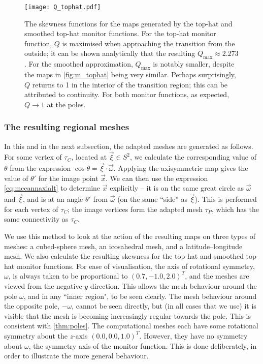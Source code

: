 \documentclass[11pt, a4paper]{scrartcl}  %
\theoremstyle{plain}
\theoremstyle{definition}
\numberwithin{equation}{section}
\begin{document}
\begin{figure}[!tb]
  \centering
  \texttt{[image: Q\_tophat.pdf]}
  \caption{The skewness functions for the maps generated by the top-hat
and smoothed top-hat monitor functions. For the top-hat monitor
function, $Q$ is maximised when approaching the transition from the
outside; it can be shown analytically that the resulting
$Q_\mathrm{max} \approx 2.273$. For the smoothed approximation,
$Q_\mathrm{max}$ is notably smaller, despite the maps in
\cref{fig:m_tophat} being very similar. Perhaps surprisingly, $Q$
returns to 1 in the interior of the transition region; this can be
attributed to continuity. For both monitor functions, as expected,
$Q \to 1$ at the poles.}
\label{fig:Q_tophat}
\end{figure}

\subsubsection{The resulting regional meshes}

In this and in the next subsection, the adapted meshes are generated as
follows. For some vertex of $\tau_C$, located at $\vec{\xi} \in S^2$, we
calculate the corresponding value of $\theta$ from the expression
$\cos\theta = \vec{\xi}\cdot\vec{\omega}$. Applying the axisymmetric map gives
the value of $\theta'$ for the image point $\vec{x}$. We can then use
the expression \cref{eq:mccannaxialt} to determine $\vec{x}$ explicitly
-- it is on the same great circle as $\vec{\omega}$ and $\vec{\xi}$, and
is at an angle $\theta'$ from $\vec{\omega}$ (on the same ``side'' as
$\vec{\xi}$). This is performed for each vertex of $\tau_C$; the image
vertices form the adapted mesh $\tau_P$, which has the same connectivity
as $\tau_C$.

We use this method to look at the action of the resulting maps on three
types of meshes: a cubed-sphere mesh, an icosahedral mesh, and a
latitude--longitude mesh. We also calculate the resulting skewness for
the top-hat and smoothed top-hat monitor functions. For ease of
visualisation, the axis of rotational symmetry, $\omega$, is
always taken to be proportional to ${(0.7, -1.0, 2.0)^T}$, and the
meshes are viewed from the negative-$y$ direction. This allows the mesh
behaviour around the pole $\omega$, and in any ``inner region", to be
seen clearly. The mesh behaviour around the opposite pole, $-\omega$,
cannot be seen directly, but (in all cases that we use) it is visible
that the mesh is becoming increasingly regular towards the pole. This is
consistent with \cref{thm:poles}. The computational meshes each have
some rotational symmetry about the $z$-axis ${(0.0, 0.0, 1.0)^T}$.
However, they have no symmetry about $\omega$, the symmetry axis of the
monitor function. This is done deliberately, in order to illustrate the
more general behaviour.
\end{document}
